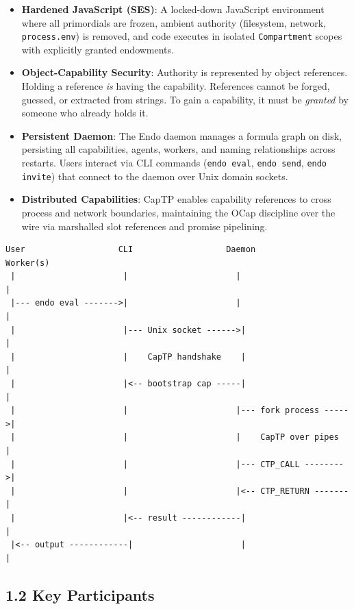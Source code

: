 \documentclass[11pt]{article}
\begin{document}
\begin{itemize}
\item \textbf{Hardened JavaScript (SES)}: A locked-down JavaScript environment where all
primordials are frozen, ambient authority (filesystem, network, \texttt{process.env})
is removed, and code executes in isolated \texttt{Compartment} scopes with
explicitly granted endowments.

\item \textbf{Object-Capability Security}: Authority is represented by object references.
Holding a reference \emph{is} having the capability. References cannot be forged,
guessed, or extracted from strings. To gain a capability, it must be
\emph{granted} by someone who already holds it.

\item \textbf{Persistent Daemon}: The Endo daemon manages a formula graph on disk,
persisting all capabilities, agents, workers, and naming relationships
across restarts. Users interact via CLI commands (\texttt{endo eval}, \texttt{endo send},
\texttt{endo invite}) that connect to the daemon over Unix domain sockets.

\item \textbf{Distributed Capabilities}: CapTP enables capability references to cross
process and network boundaries, maintaining the OCap discipline over the
wire via marshalled slot references and promise pipelining.
\end{itemize}

\begin{verbatim}
User                   CLI                   Daemon                  Worker(s)
 |                      |                      |                       |
 |--- endo eval ------->|                      |                       |
 |                      |--- Unix socket ------>|                       |
 |                      |    CapTP handshake    |                       |
 |                      |<-- bootstrap cap -----|                       |
 |                      |                      |--- fork process ----->|
 |                      |                      |    CapTP over pipes    |
 |                      |                      |--- CTP_CALL -------->|
 |                      |                      |<-- CTP_RETURN -------|
 |                      |<-- result ------------|                       |
 |<-- output ------------|                      |                       |
\end{verbatim}
\subsection{1.2 Key Participants}
\label{sec:orga2de8d2}
\end{document}
